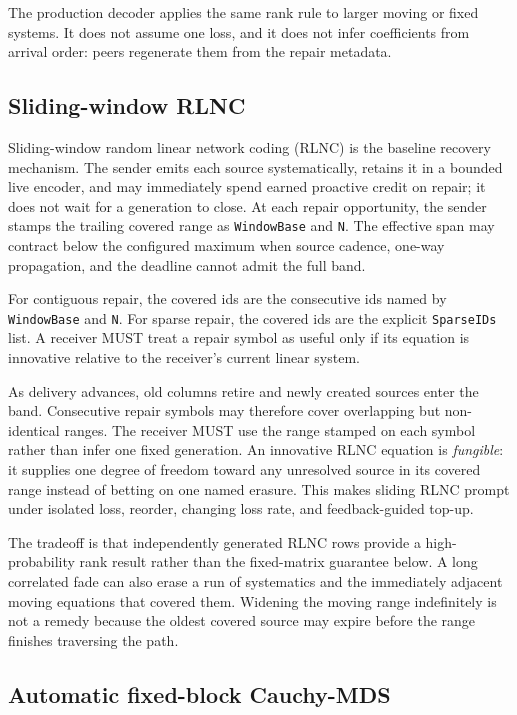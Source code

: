 \documentclass[11pt]{article}
\newcommand{\code}[1]{\ifmmode\text{\texttt{#1}}\else\texttt{#1}\fi}
\newcommand{\field}[1]{\code{#1}}
\begin{document}
The production decoder applies the same rank rule to larger moving or fixed
systems. It does not assume one loss, and it does not infer coefficients from
arrival order: peers regenerate them from the repair metadata.

\subsection{Sliding-window RLNC}
\label{sec:sliding-rlnc}

Sliding-window random linear network coding (RLNC) is the baseline recovery
mechanism. The sender emits each source systematically, retains it in a bounded
live encoder, and may immediately spend earned proactive credit on repair; it
does not wait for a generation to close. At each repair opportunity, the sender
stamps the trailing covered range as \field{WindowBase} and \field{N}. The
effective span may contract below the configured maximum when source cadence,
one-way propagation, and the deadline cannot admit the full band.

For contiguous repair, the covered ids are the consecutive ids named by
\field{WindowBase} and \field{N}. For sparse repair, the covered ids are the
explicit \field{SparseIDs} list. A receiver MUST treat a repair symbol as useful
only if its equation is innovative relative to the receiver's current linear
system.

As delivery advances, old columns retire and newly created sources enter the
band. Consecutive repair symbols may therefore cover overlapping but non-identical
ranges. The receiver MUST use the range stamped on each symbol rather than infer
one fixed generation. An innovative RLNC equation is \emph{fungible}: it supplies
one degree of freedom toward any unresolved source in its covered range instead
of betting on one named erasure. This makes sliding RLNC prompt under isolated
loss, reorder, changing loss rate, and feedback-guided top-up.

The tradeoff is that independently generated RLNC rows provide a high-probability
rank result rather than the fixed-matrix guarantee below. A long correlated fade
can also erase a run of systematics and the immediately adjacent moving equations
that covered them. Widening the moving range indefinitely is not a remedy because
the oldest covered source may expire before the range finishes traversing the
path.

\subsection{Automatic fixed-block Cauchy-MDS}
\label{sec:auto-mds}
\end{document}
